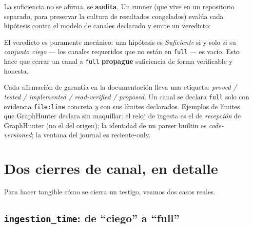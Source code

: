 \documentclass[11pt,a4paper]{article}
\newcommand{\code}[1]{\texttt{\small #1}}
\begin{document}
La suficiencia no se afirma, se \textbf{audita}. Un runner (que vive en un
repositorio separado, para preservar la cultura de resultados congelados)
evalúa cada hipótesis contra el modelo de canales declarado y emite un
veredicto:

\begin{center}
\end{center}

El veredicto es puramente mecánico: una hipótesis es \emph{Suficiente} si y
solo si su \emph{conjunto ciego} --- los canales requeridos que no están en
\code{full} --- es vacío. Esto hace que cerrar un canal a \code{full}
\textbf{propague} suficiencia de forma verificable y honesta.

\begin{keybox}
Cada afirmación de garantía en la documentación lleva una etiqueta:
\emph{proved / tested / implemented / read-verified / proposed}. Un canal se
declara \code{full} solo con evidencia \code{file:line} concreta \emph{y} con
sus límites declarados. Ejemplos de límites que GraphHunter declara sin
maquillar: el reloj de ingesta es el de \emph{recepción} de GraphHunter (no el
del origen); la identidad de un parser builtin es \emph{code-versioned}; la
ventana del journal es reciente-only.
\end{keybox}

\section{Dos cierres de canal, en detalle}

Para hacer tangible cómo se cierra un testigo, veamos dos casos reales.

\subsection{\texttt{ingestion\_time}: de ``ciego'' a ``full''}
\end{document}
